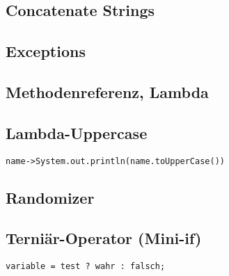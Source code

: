 \subsection{Concatenate Strings}
    \vspace{-0.3cm}
    
    \vspace{-0.2cm}

\subsection{Exceptions}
    \vspace{-0.3cm}
    
    \vspace{-0.2cm}

\subsection{Methodenreferenz, Lambda}\label{Lambdas}
    \vspace{-0.3cm}
    
    \vspace{-0.2cm}

\subsection{Lambda-Uppercase}
    {\small\verb|name->System.out.println(name.toUpperCase())|}
    \vspace{-0.2cm}

\subsection{Randomizer}
    \vspace{-0.3cm}
    
    \vspace{-0.2cm}

\subsection{Terniär-Operator (Mini-if)}
    {\small\verb|variable = test ? wahr : falsch;|}
